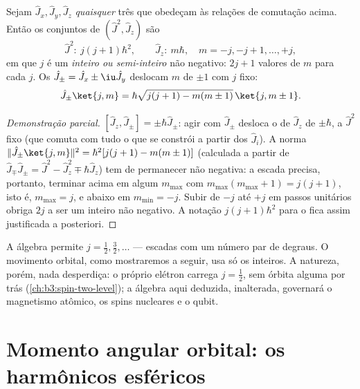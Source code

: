 \begin{theorem}\label{thm:b3:quantum-angular-momentum:spectrum}
Sejam $\hat J_x, \hat J_y, \hat J_z$ \emph{quaisquer} três  que obedeçam às relações de comutação acima. Então os
 conjuntos de $(\hat J^2, \hat J_z)$ são
\[
\hat J^2:\ j(j+1)\hbar^2 , \qquad
\hat J_z:\ m\hbar , \quad m = -j, -j+1, \dots, +j ,
\]
em que $j$ é um \emph{inteiro ou semi-inteiro} não negativo: $2j + 1$
valores de $m$ para cada $j$. Os  $\hat J_\pm = \hat
J_x \pm \iu\hat J_y$ deslocam $m$ de $\pm1$ com $j$ fixo:
\[
\hat J_\pm\ket{j,m} = \hbar\sqrt{j(j+1) - m(m\pm1)}\,\ket{j,m\pm1} .
\]
\end{theorem}

\begin{proof}[Demonstração parcial]
$[\hat J_z, \hat J_\pm] = \pm\hbar\hat J_\pm$: agir com $\hat
J_\pm$ desloca o  de $\hat J_z$ de $\pm\hbar$, a $\hat J^2$
fixo (que comuta com tudo o que se constrói a partir dos $\hat
J_i$). A norma $\|\hat J_\pm\ket{j,m}\|^2 = \hbar^2[j(j+1) -
m(m\pm1)]$ (calculada a partir de $\hat J_\mp\hat J_\pm = \hat J^2 - \hat
J_z^2 \mp \hbar\hat J_z$) tem de permanecer não negativa: a escada
precisa, portanto, terminar acima em algum $m_{\max}$ com
$m_{\max}(m_{\max}+1) =
j(j+1)$, isto é, $m_{\max} = j$, e abaixo em $m_{\min} = -j$. Subir de
$-j$ até $+j$ em passos unitários obriga $2j$ a ser um inteiro não
negativo. A notação $j(j+1)\hbar^2$ para o  fica assim
justificada a posteriori.
\end{proof}

\begin{remark}\label{rem:b3:quantum-angular-momentum:halfinteger}
A álgebra permite $j = \tfrac12, \tfrac32, \dots$ --- escadas com um
número par de degraus. O movimento orbital, como mostraremos a seguir,
usa só os inteiros. A natureza, porém, nada desperdiça: o próprio
elétron carrega $j = \tfrac12$, sem órbita alguma por trás
(\cref{ch:b3:spin-two-level}); a álgebra aqui deduzida, inalterada,
governará o magnetismo atômico, os spins nucleares e o qubit.
\end{remark}

\section{Momento angular orbital: os harmônicos esféricos}

